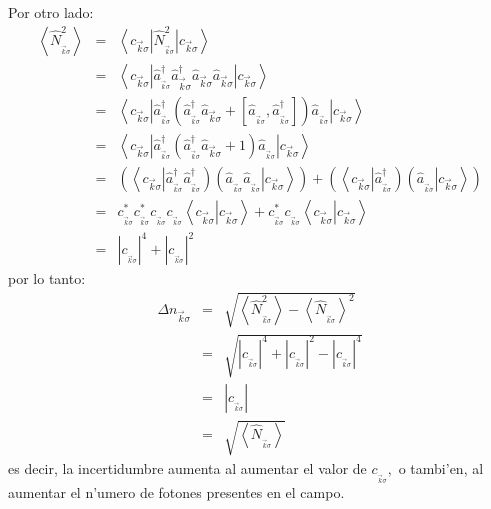 Por otro lado:%
\begin{eqnarray}
\left\langle \hat{N}_{_{\vec{k}\sigma}}^{2}\right> & = &\left\langle
c_{\vec{k}\sigma}\right| \hat{N}_{_{\vec{k}\sigma}}^{2}\left|
c_{\vec{k}\sigma}\right> \\
& = &\left\langle c_{\vec{k}\sigma}\right| \hat{a}_{_{\vec{k}\sigma}%
}^{\dagger}\hat{a}_{\vec{k}\sigma}^{\dagger}\hat{a}_{\vec{k}\sigma}\hat
{a}_{\vec{k}\sigma}\left| c_{\vec{k}\sigma}\right> \\
& = &\left\langle c_{\vec{k}\sigma}\right| \hat{a}_{_{\vec{k}\sigma}%
}^{\dagger}\left( \hat{a}_{_{\vec{k}\sigma}}^{\dagger}\hat{a}_{\vec{k}\sigma
}+[\hat{a}_{_{\vec{k}\sigma}},\hat{a}_{_{\vec{k}\sigma}}^{\dagger}]\right)
\hat{a}_{_{\vec{k}\sigma}}\left| c_{\vec{k}\sigma}\right> \\
& = &\left\langle c_{\vec{k}\sigma}\right| \hat{a}_{_{\vec{k}\sigma}%
}^{\dagger}\left( \hat{a}_{_{\vec{k}\sigma}}^{\dagger}\hat{a}_{\vec{k}\sigma
}+1\right) \hat{a}_{_{\vec{k}\sigma}}\left| c_{\vec{k}\sigma
}\right> \\
& = &\left( \left\langle c_{\vec{k}\sigma}\right| \hat{a}_{_{\vec{k}\sigma
}}^{\dagger}\hat{a}_{_{\vec{k}\sigma}}^{\dagger}\right) \left( \hat
{a}_{_{\vec{k}\sigma}}\hat{a}_{_{\vec{k}\sigma}}\left| c_{\vec{k}\sigma
}\right> \right) +\left( \left\langle c_{\vec{k}\sigma}\right|
\hat{a}_{_{\vec{k}\sigma}}^{\dagger}\right) \left( \hat{a}_{_{\vec{k}\sigma
}}\left| c_{\vec{k}\sigma}\right> \right) \\
& = &c_{_{\vec{k}\sigma}}^{\ast}c_{_{\vec{k}\sigma}}^{\ast}c_{_{\vec{k}\sigma}%
}c_{_{\vec{k}\sigma}}\left\langle c_{\vec{k}\sigma}\right| \left.
c_{\vec{k}\sigma}\right> +c_{_{\vec{k}\sigma}}^{\ast}c_{_{\vec{k}\sigma
}}\left\langle c_{\vec{k}\sigma}\right| \left. c_{\vec{k}\sigma
}\right> \\
& = &|c_{_{\vec{k}\sigma}}|^{4}+|c_{_{\vec{k}\sigma}}|^{2}%
\end{eqnarray}
por lo tanto:%
\begin{eqnarray}
\Delta n_{\vec{k}\sigma} & = &\sqrt{\left\langle \hat{N}_{_{\vec{k}\sigma}}%
^{2}\right> -\left\langle \hat{N}_{_{\vec{k}\sigma}}\right> ^{2}%
}\\
& = &\sqrt{|c_{_{\vec{k}\sigma}}|^{4}+|c_{_{\vec{k}\sigma}}|^{2}-|c_{_{\vec
{k}\sigma}}|^{4}}\\
& = &|c_{_{\vec{k}\sigma}}|\\
& = &\sqrt{\left\langle \hat{N}_{_{\vec{k}\sigma}}\right> }%
\end{eqnarray}
es decir, la incertidumbre aumenta al aumentar el valor de $c_{_{\vec{k}%
\sigma}},$ o tambi'en, al aumentar el n'umero de fotones presentes en el campo.

